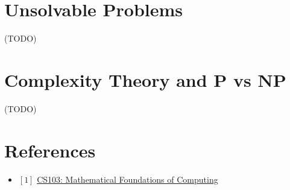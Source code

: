 \documentclass[12pt, letterpaper, oneside]{book}
\begin{document}
\chapter{Unsolvable Problems}

 (TODO)

%
%

\chapter{Complexity Theory and P vs NP}

 (TODO)

\chapter*{References}

\begin{itemize}
  \item $[1]$ \href{https://web.stanford.edu/class/cs103/}{CS103: Mathematical Foundations of Computing}
\end{itemize}
\end{document}
